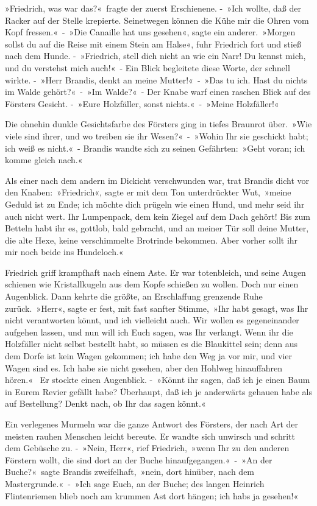 »Friedrich, was war das?« fragte der zuerst Erschienene. - »Ich wollte, daß der Racker auf der Stelle krepierte. Seinetwegen können die Kühe mir die Ohren vom Kopf fressen.« - »Die Canaille hat uns gesehen«, sagte ein anderer. »Morgen sollst du auf die Reise mit einem Stein am Halse«, fuhr Friedrich fort und stieß nach dem Hunde. - »Friedrich, stell dich nicht an wie ein Narr! Du kennst mich, und du verstehst mich auch!« - Ein Blick begleitete diese Worte, der schnell wirkte. - »Herr Brandis, denkt an meine Mutter!« - »Das tu ich. Hast du nichts im Walde gehört?« - »Im Walde?« - Der Knabe warf einen raschen Blick auf des Försters Gesicht. - »Eure Holzfäller, sonst nichts.« - »Meine Holzfäller!«

Die ohnehin dunkle Gesichtsfarbe des Försters ging in tiefes Braunrot über. »Wie viele sind ihrer, und wo treiben sie ihr Wesen?« - »Wohin Ihr sie geschickt habt; ich weiß es nicht.« - Brandis wandte sich zu seinen Gefährten: »Geht voran; ich komme gleich nach.«

Als einer nach dem andern im Dickicht verschwunden war, trat Brandis dicht vor den Knaben: »Friedrich«, sagte er mit dem Ton unterdrückter Wut, »meine Geduld ist zu Ende; ich möchte dich prügeln wie einen Hund, und mehr seid ihr auch nicht wert. Ihr Lumpenpack, dem kein Ziegel auf dem Dach gehört! Bis zum Betteln habt ihr es, gottlob, bald gebracht, und an meiner Tür soll deine Mutter, die alte Hexe, keine verschimmelte Brotrinde bekommen. Aber vorher sollt ihr mir noch beide ins Hundeloch.«

Friedrich griff krampfhaft nach einem Aste. Er war totenbleich, und seine Augen schienen wie Kristallkugeln aus dem Kopfe schießen zu wollen. Doch nur einen Augenblick. Dann kehrte die größte, an Erschlaffung grenzende Ruhe zurück. »Herr«, sagte er fest, mit fast sanfter Stimme, »Ihr habt gesagt, was Ihr nicht verantworten könnt, und ich vielleicht auch. Wir wollen es gegeneinander aufgehen lassen, und nun will ich Euch sagen, was Ihr verlangt. Wenn ihr die Holzfäller nicht selbst bestellt habt, so müssen es die Blaukittel sein; denn aus dem Dorfe ist kein Wagen gekommen; ich habe den Weg ja vor mir, und vier Wagen sind es. Ich habe sie nicht gesehen, aber den Hohlweg hinauffahren hören.«  Er stockte einen Augenblick. - »Könnt ihr sagen, daß ich je einen Baum in Eurem Revier gefällt habe? Überhaupt, daß ich je anderwärts gehauen habe als auf Bestellung? Denkt nach, ob Ihr das sagen könnt.«

Ein verlegenes Murmeln war die ganze Antwort des Försters, der nach Art der meisten rauhen Menschen leicht bereute. Er wandte sich unwirsch und schritt dem Gebüsche zu. - »Nein, Herr«, rief Friedrich, »wenn Ihr zu den anderen Förstern wollt, die sind dort an der Buche hinaufgegangen.« - »An der Buche?« sagte Brandis zweifelhaft, »nein, dort hinüber, nach dem Mastergrunde.« - »Ich sage Euch, an der Buche; des langen Heinrich Flintenriemen blieb noch am krummen Ast dort hängen; ich habs ja gesehen!«

